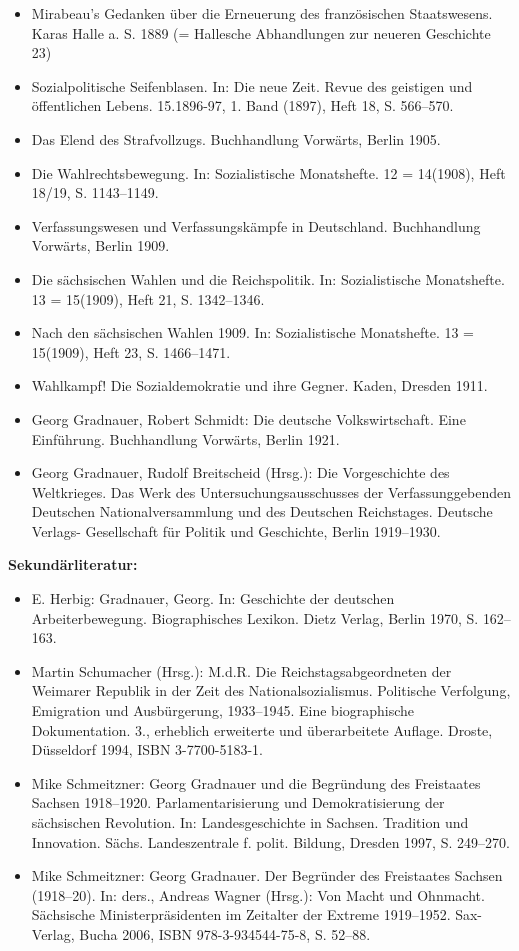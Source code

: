 \documentclass[a4paper]{article}
\begin{document}
\begin{itemize}
\item Mirabeau's Gedanken über die Erneuerung des französischen Staatswesens. Karas Halle a. S. 1889 (= Hallesche
Abhandlungen zur neueren Geschichte 23)  
\item Sozialpolitische Seifenblasen. In: Die neue Zeit. Revue des geistigen und öffentlichen Lebens. 15.1896-97, 1. Band
(1897), Heft 18, S. 566–570.  
\item Das Elend des Strafvollzugs. Buchhandlung Vorwärts, Berlin 1905.  
\item Die Wahlrechtsbewegung. In: Sozialistische Monatshefte. 12 = 14(1908), Heft 18/19, S. 1143–1149.  
\item Verfassungswesen und Verfassungskämpfe in Deutschland. Buchhandlung Vorwärts, Berlin 1909.  
\item Die sächsischen Wahlen und die Reichspolitik. In: Sozialistische Monatshefte. 13 = 15(1909), Heft 21, S.
1342–1346.  
\item Nach den sächsischen Wahlen 1909. In: Sozialistische Monatshefte. 13 = 15(1909), Heft 23, S. 1466–1471.  
\item Wahlkampf! Die Sozialdemokratie und ihre Gegner. Kaden, Dresden 1911.  
\item Georg Gradnauer, Robert Schmidt: Die deutsche Volkswirtschaft. Eine Einführung. Buchhandlung Vorwärts, Berlin
1921. 
\item Georg Gradnauer, Rudolf Breitscheid (Hrsg.): Die Vorgeschichte des Weltkrieges. Das Werk des
Untersuchungsausschusses der Verfassunggebenden Deutschen Nationalversammlung und des Deutschen Reichstages. Deutsche
Verlags- Gesellschaft für Politik und Geschichte, Berlin 1919–1930.
\end{itemize}

\bigskip

\textbf{Sekundärliteratur:}

\begin{itemize}
\item E. Herbig: Gradnauer, Georg. In: Geschichte der deutschen Arbeiterbewegung. Biographisches Lexikon. Dietz Verlag,
Berlin 1970, S. 162–163.  
\item Martin Schumacher (Hrsg.): M.d.R. Die Reichstagsabgeordneten der Weimarer Republik in der Zeit des
Nationalsozialismus. Politische Verfolgung, Emigration und Ausbürgerung, 1933–1945. Eine biographische Dokumentation.
3., erheblich erweiterte und überarbeitete Auflage. Droste, Düsseldorf 1994, ISBN 3-7700-5183-1.  
\item Mike Schmeitzner: Georg Gradnauer und die Begründung des Freistaates Sachsen 1918–1920. Parlamentarisierung und
Demokratisierung der sächsischen Revolution. In: Landesgeschichte in Sachsen. Tradition und Innovation. Sächs.
Landeszentrale f. polit. Bildung, Dresden 1997, S. 249–270.  
\item Mike Schmeitzner: Georg Gradnauer. Der Begründer des Freistaates Sachsen (1918–20). In: ders., Andreas Wagner
(Hrsg.): Von Macht und Ohnmacht. Sächsische Ministerpräsidenten im Zeitalter der Extreme 1919–1952. Sax-Verlag, Bucha
2006, ISBN 978-3-934544-75-8, S. 52–88.
\end{itemize}
\end{document}

